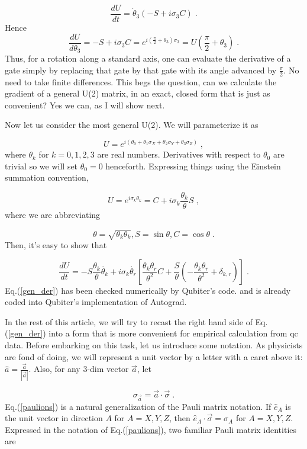 \documentclass[12pt]{article}
\newcommand{\beq}{\begin{equation}}
\newcommand{\eeq}{\end{equation}}
\begin{document}
\beq
\frac{dU}{dt} = \dot{\theta}_3(-S + i\sigma_3 C)
\;.
\eeq
Hence
\beq
\frac{dU}{d\theta_3}=
-S + i\sigma_3 C=e^{i(\frac{\pi}{2}+\theta_3)\sigma_3}
=U(\frac{\pi}{2}+\theta_3)
\;.
\eeq
Thus, for a rotation along a standard axis,
one can evaluate the derivative of a gate
simply
by replacing that gate by that gate
with its angle advanced by $\frac{\pi}{2}$.
No need to take finite differences.
This begs the question,
can we calculate the gradient
of a general U(2) matrix,
in an exact, closed form
that is just as
convenient? Yes we can, as I will show next.

Now let us consider the most general U(2).
We will parameterize it as

\beq
U= e^{i(\theta_0 + \theta_1\sigma_X
+ \theta_2\sigma_Y
+ \theta_3\sigma_Z)}
\;,
\label{u2_pametrization}
\eeq
where $\theta_k$ for $k = 0, 1, 2, 3$ are real numbers.
Derivatives with respect to $\theta_0$
are trivial so we will set $\theta_0=0$ henceforth.
Expressing things using the Einstein summation convention,

\beq U = e^{i\sigma_k\theta_k} = C +
i\sigma_k \frac{\theta_k}{\theta} S
\;,
\eeq
where we are abbreviating

\beq
\theta = \sqrt{\theta_k\theta_k},
 S = \sin\theta, C = \cos \theta
 \;.
 \eeq
 Then, it's easy to show that

 \beq
 \frac{dU}{dt}=-S \frac{\theta_k}{\theta}
 \dot{\theta_k}+ i\sigma_k\dot{\theta_r}
 \left[\frac{\theta_k\theta_r}{\theta^2} C+
  \frac{S}{\theta}(-\frac{\theta_k\theta_r}{\theta^2}
  + \delta_{k, r})\right]
  \;.
  \label{gen_der}
  \eeq
 Eq.(\ref{gen_der}) has
 been checked numerically
 by Qubiter's code. and is already
coded into Qubiter's implementation of Autograd.


In the rest of this article,
we will try to recast the right hand side of
 Eq.(\ref{gen_der}) into a form that
 is more convenient for empirical
 calculation from qc data.
Before embarking on this task,
let us introduce some notation.
As physicists are fond of doing, we will
represent a unit vector by
a letter with a caret above it:
$\hat{a} = \frac{\vec{a}}{|\vec{a}|}$.
Also, for any 3-dim vector $\vec{a}$, let

\beq
\sigma_{\vec{a}}=\vec{a}\cdot\vec{\sigma}
\;.
\label{paulions}
\eeq
Eq.(\ref{paulions}) is a natural generalization
of the Pauli matrix notation. If $\hat{e}_A$
is the unit vector in direction $A$ for $A=X,Y,Z$,
then $\hat{e}_A\cdot\vec{\sigma} = \sigma_A$ for
$A=X,Y,Z$. Expressed in
the notation of Eq.(\ref{paulions}),
two familiar Pauli matrix identities
are
\end{document}
